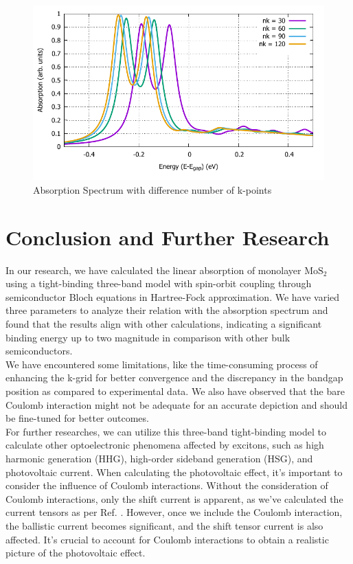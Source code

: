 \documentclass[12pt,english,a4paper]{article}
\begin{document}
\begin{figure}
	\begin{center}
		\includegraphics[width=0.75\linewidth]{images/varynk.pdf}
		\caption[Absorption Spectrum with difference number of k-points]{Absorption Spectrum with difference number of k-points}
		\label{Vary nk}
	\end{center}
\end{figure}\null
\newpage
\section{Conclusion and Further Research}
\quad In our research, we have calculated the linear absorption of monolayer $\mathrm{MoS}_2$ using a tight-binding three-band model with spin-orbit coupling through semiconductor Bloch equations in Hartree-Fock approximation. We have varied three parameters to analyze their relation with the absorption spectrum and found that the results align with other calculations, indicating a significant binding energy up to two magnitude in comparison with other bulk semiconductors.\\\null
\quad We have encountered some limitations, like the time-consuming process of enhancing the k-grid for better convergence and the discrepancy in the bandgap position as compared to experimental data. We also have observed that the bare Coulomb interaction might not be adequate for an accurate depiction and should be fine-tuned for better outcomes.\\\null
\quad For further researches, we can utilize this three-band tight-binding model to calculate other optoelectronic phenomena affected by excitons, such as high harmonic generation (HHG), high-order sideband generation (HSG), and photovoltaic current. When calculating the photovoltaic effect, it's important to consider the influence of Coulomb interactions. Without the consideration of Coulomb interactions, only the shift current is apparent, as we've calculated the current tensors as per Ref. \cite{vo_calculation_2024}. However, once we include the Coulomb interaction, the ballistic current becomes significant, and the shift tensor current is also affected. It's crucial to account for Coulomb interactions to obtain a realistic picture of the photovoltaic effect.
\end{document}

